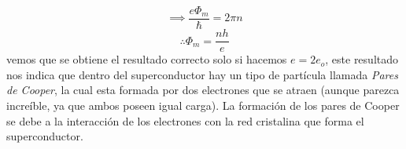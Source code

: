 \documentclass[12pt]{article}
\begin{document}
\begin{equation}
\implies \frac{e\Phi_m}{\hbar}=2\pi n
\end{equation}
\begin{equation}
\therefore \Phi_m=\frac{nh}{e}
\end{equation}
vemos que se obtiene el resultado correcto solo si hacemos $e=2e_o$, este resultado nos indica que dentro del superconductor hay un tipo de partícula llamada \textit{Pares de Cooper}, la cual esta formada por dos electrones que se atraen (aunque parezca increíble, ya que ambos poseen igual carga). La formación de los pares de Cooper se debe a la interacción de los electrones con la red cristalina que forma el superconductor.




\end{document}
